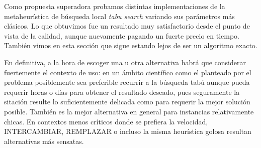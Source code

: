 Como propuesta superadora probamos distintas implementaciones de la metaheurística de búsqueda local \emph{tabu search} variando sus parámetros más clásicos. Lo que obtuvimos fue un resultado muy satisfactorio desde el punto de vista de la calidad, aunque nuevamente pagando un fuerte precio en tiempo. También vimos en esta sección que sigue estando lejos de ser un algoritmo exacto.

En definitiva, a la hora de escoger una u otra alternativa habrá que considerar fuertemente el contexto de uso: en un ámbito científico como el planteado por el problema posiblemente sea preferible recurrir a la búsqueda tabú aunque pueda requerir horas o días para obtener el resultado deseado, pues seguramente la sitación resulte lo suficientemente delicada como para requerir la mejor solución posible. También es la mejor alternativa en general para instancias relativamente chicas. En contextos menos críticos donde se prefiera la velocidad, INTERCAMBIAR, REMPLAZAR o incluso la misma heurística golosa resultan alternativas más sensatas.  


